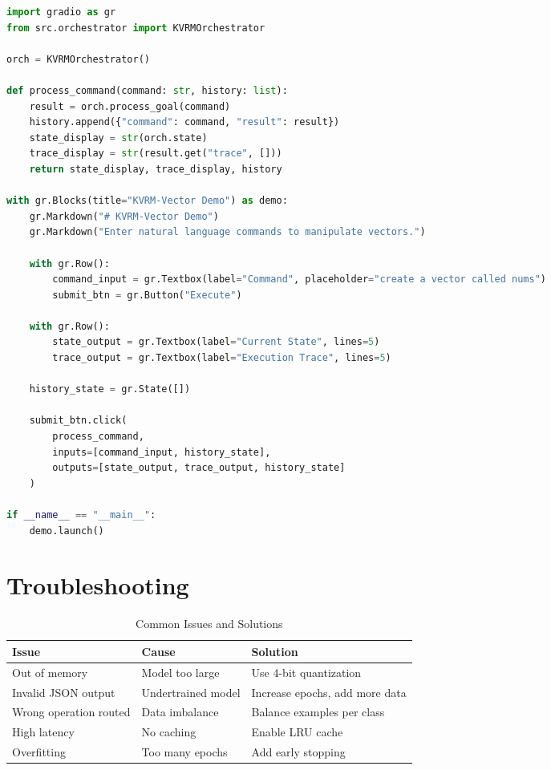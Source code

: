 \documentclass[11pt,a4paper]{article}
\begin{document}
\begin{lstlisting}[language=Python, caption={gradio\_app.py}]
import gradio as gr
from src.orchestrator import KVRMOrchestrator

orch = KVRMOrchestrator()

def process_command(command: str, history: list):
    result = orch.process_goal(command)
    history.append({"command": command, "result": result})
    state_display = str(orch.state)
    trace_display = str(result.get("trace", []))
    return state_display, trace_display, history

with gr.Blocks(title="KVRM-Vector Demo") as demo:
    gr.Markdown("# KVRM-Vector Demo")
    gr.Markdown("Enter natural language commands to manipulate vectors.")

    with gr.Row():
        command_input = gr.Textbox(label="Command", placeholder="create a vector called nums")
        submit_btn = gr.Button("Execute")

    with gr.Row():
        state_output = gr.Textbox(label="Current State", lines=5)
        trace_output = gr.Textbox(label="Execution Trace", lines=5)

    history_state = gr.State([])

    submit_btn.click(
        process_command,
        inputs=[command_input, history_state],
        outputs=[state_output, trace_output, history_state]
    )

if __name__ == "__main__":
    demo.launch()
\end{lstlisting}

\section{Troubleshooting}

\begin{table}[h]
\centering
\begin{tabular}{p{4cm}p{4cm}p{4cm}}
\toprule
\textbf{Issue} & \textbf{Cause} & \textbf{Solution} \\
\midrule
Out of memory & Model too large & Use 4-bit quantization \\
Invalid JSON output & Undertrained model & Increase epochs, add more data \\
Wrong operation routed & Data imbalance & Balance examples per class \\
High latency & No caching & Enable LRU cache \\
Overfitting & Too many epochs & Add early stopping \\
\bottomrule
\end{tabular}
\caption{Common Issues and Solutions}
\end{table}
\end{document}
